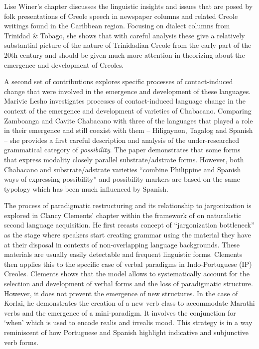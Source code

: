 \documentclass[output=paper, colorlinks,citecolor=brown]{langscibook}
\begin{document}
Lise Winer’s chapter discusses the linguistic insights and issues that are posed by folk presentations of Creole speech in newspaper columns and related Creole writings found in the Caribbean region. Focusing on dialect columns from Trinidad \& Tobago, she shows that with careful analysis these give a relatively substantial picture of the nature of Trinidadian Creole from the early part of the 20th century and should be given much more attention in theorizing about the emergence and development of Creoles.

\begin{sloppypar}
A second set of contributions explores specific processes of contact-induced change that were involved in the emergence and development of these languages. Marivic Lesho investigates processes of contact-induced language change in the context of the emergence and development of varieties of Chabacano. Comparing Zamboanga and Cavite Chabacano with three of the languages that played a role in their emergence and still coexist with them – Hiligaynon, Tagalog and Spanish – she provides a first careful description and analysis of the under-researched grammatical category of \textit{possibility}. The paper demonstrates that some forms that express modality closely parallel substrate/adstrate forms. However, both Chabacano and substrate/adstrate varieties “combine Philippine and Spanish ways of expressing possibility” and possibility markers are based on the same typology which has been much influenced by Spanish. 
\end{sloppypar}

The process of paradigmatic restructuring and its relationship to jargonization is explored in Clancy Clements' chapter within the framework of \citet{KleinPerdue1992, KleinPerdue1997} on naturalistic second language acquisition. He first recasts  concept of “jargonization bottleneck” as the stage where speakers start creating grammar using the material they have at their disposal in contexts of non-overlapping language backgrounds. These materials are usually easily detectable and frequent linguistic forms. Clements then applies this to the specific case of verbal paradigms in Indo-Portuguese (IP) Creoles. Clements shows that the model allows to systematically account for the selection and development of verbal forms and the loss of paradigmatic structure. However, it does not prevent the emergence of new structures. In the case of Korlai, he demonstrates the creation of a new verb class to accommodate Marathi verbs and the emergence of a mini-paradigm. It involves the conjunction for ‘when’ which is used to encode realis and irrealis mood. This strategy is in a way reminiscent of how Portuguese and Spanish highlight indicative and subjunctive verb forms. 
\end{document}
